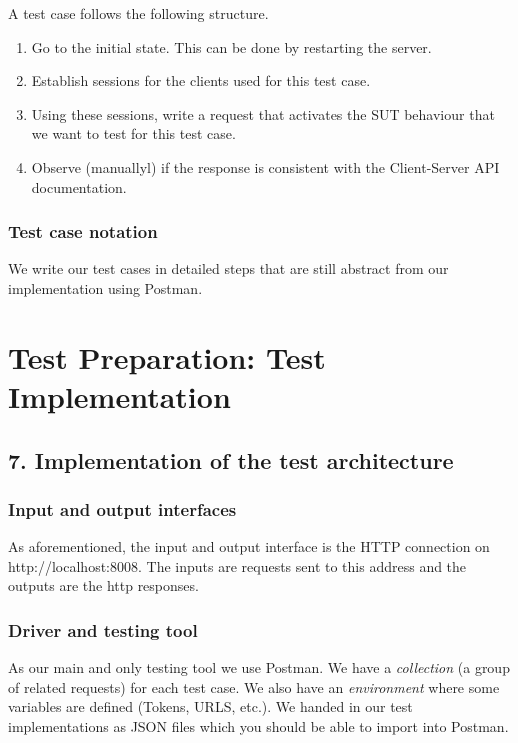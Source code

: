 \documentclass{article}
\begin{document}
\noindent A test case follows the following structure. 
\begin{enumerate}
    \item Go to the initial state. This can be done by restarting the server.
    \item Establish sessions for the clients used for this test case.
    \item Using these sessions, write a request that activates the SUT behaviour that we want to test for this test case.
    \item Observe (manuallyl) if the response is consistent with the Client-Server API documentation.
\end{enumerate}


\subsubsection*{Test case notation}
We write our test cases in detailed steps that are still abstract from our implementation using Postman.

\section*{Test Preparation: Test Implementation}
\subsection*{7. Implementation of the test architecture}
\subsubsection*{Input and output interfaces}
As aforementioned, the input and output interface is the HTTP connection on http://localhost:8008.
The inputs are requests sent to this address and the outputs are the http responses.
\subsubsection*{Driver and testing tool}
As our main and only testing tool we use Postman. We have a \textit{collection} (a group of related requests) for each test case. We also have an \textit{environment} where some variables are defined (Tokens, URLS, etc.). We handed in our test implementations as JSON files which you should be able to import into Postman.
\end{document}

